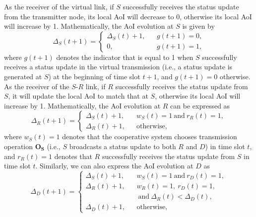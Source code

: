\documentclass{IEEEtran}
\begin{document}
As the receiver of the virtual link, if $S$ successfully receives the status update from the transmitter node, its local AoI will decrease to 0, otherwise its local AoI will increase by 1. Mathematically, the AoI evolution at $S$ is given by
\begin{equation}\label{aois}
	\Delta_{S}(t+1)=\left\{
	\begin{array}{rcl}
	\Delta_{S}(t)+1,    &      & g(t+1)=0,\\
	0,       &      & g(t+1)=1,
	\end{array} \right.
\end{equation}
where $g(t+1)$ denotes the indicator that is equal to 1 when $S$ successfully receives a status update in the virtual transmission (i.e., a status update is generated at $S$) at the beginning of time slot $t+1$, and $g(t+1)=0$ otherwise. As the receiver of the $S$-$R$ link, if $R$ successfully receives the status update from $S$, it will update the local AoI to match that at $S$, otherwise its local AoI will increase by 1. Mathematically, the AoI evolution at $R$ can be expressed as
\begin{equation}
\Delta_{R}(t+1)=\left\{
\begin{array}{rcl}
\Delta_{S}(t)+1,    &      & w_S(t)=1\ \text{and}\ r_R(t)=1,\\
\Delta_{R}(t)+1,       &      & \text{otherwise},
\end{array} \right.
\end{equation}
where $w_S(t)=1$ denotes that the cooperative system chooses transmission operation $\mathbf{O}_{\mathbf{S}}$ (i.e., $S$ broadcasts a status update to both $R$ and $D$) in time slot $t$, and $r_R(t)=1$ denotes that $R$ successfully receives the status update from $S$ in time slot $t$. Similarly, we can also express the AoI evolution at $D$ as
\begin{equation}\label{aoid}
\Delta_{D}(t+1)=\left\{
\begin{array}{rcl}
\Delta_{S}(t)+1,    &      & w_S(t)=1\ \text{and}\ r_D(t)=1,\\
\Delta_{R}(t)+1,    &      &   w_R(t)=1,\ r_D(t)=1,\\
& &\ \text{and}\ \Delta_{R}(t) < \Delta_{D}(t),\\
\Delta_{D}(t)+1,       &      & \text{otherwise},
\end{array} \right.
\end{equation}
\end{document}
